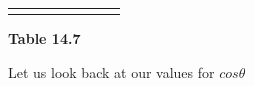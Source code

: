 \begin{center}
\begin{xtabular*}{\mytablewidth}[t]{|p{10\mystarwidth}|p{10\mystarwidth}|p{10\mystarwidth}|p{10\mystarwidth}|p{10\mystarwidth}|p{10\mystarwidth}|p{10\mystarwidth}|p{10\mystarwidth}|}
{    \addtocounter{footnote}{-0}
    
                }
     \tabularnewline{}
    \end{xtabular*}
      \end{center}
    \begin{center}{\small\bfseries Table 14.7}\end{center}
    
    \addtocounter{footnote}{-0}
    
    \par
  
        
        
        

        \label{m39414*id86892}Let us look back at our values for \begin{math}cos\theta \end{math}\par 
        
    
